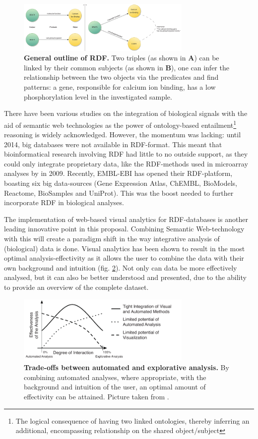 \documentclass[twoside,fontsize=12pt]{article}
\begin{document}
\begin{figure}[H]
    \centering
    \includegraphics[width=0.75\textwidth]{rdf.pdf}
    \caption{\textbf{General outline of RDF.} Two triples (as shown in \textbf{A}) can be linked by their common subjects (as shown in \textbf{B}), one can infer the relationship between the two objects via the predicates and find patterns: a gene, responsible for calcium ion binding, has a low phosphorylation level in the investigated sample.}
    \label{fig:rdf}
\end{figure}
\noindent
There have been various studies on the integration of biological signals with the aid of semantic web technologies as the power of ontology-based entailment\footnote{The logical consequence of having two linked ontologies, thereby inferring an additional, encompassing relationship on the shared object/subject} reasoning is widely acknowledged\cite{Sahoo2008}. However, the momentum was lacking: until 2014, big databases were not available in RDF-format. This meant that bioinformatical research involving RDF had little to no outside support, as they could only integrate proprietary data, like the RDF-methods used in microarray analyses by \citet{Szpakowski2009} in 2009. Recently, EMBL-EBI has opened their RDF-platform, boasting six big data-sources (Gene Expression Atlas, ChEMBL, BioModels, Reactome, BioSamples and UniProt)\cite{Jupp2014}. This was the boost needed to further incorporate RDF in biological analyses.


The implementation of web-based visual analytics for RDF-databases is another leading innovative point in this proposal. Combining Semantic Web-technology with this will create a paradigm shift in the way integrative analysis of (biological) data is done. Visual analytics has been shown to result in the most optimal analysis-effectivity as it allows the user to combine the data with their own background and intuition (fig. \ref{fig:ae}). Not only can data be more effectively analysed, but it can also be better understood and presented, due to the ability to provide an overview of the complete dataset\cite{Thomas2005, Keim}. 
\begin{figure}[h!]
    \centering
    \includegraphics[width=0.75\textwidth]{autoVSexplo.pdf}
    \caption{\textbf{Trade-offs between automated and explorative analysis.} By combining automated analyses, where appropriate, with the background and intuition of the user, an optimal amount of effectivity can be attained. Picture taken from \citet{Keim}.}
    \label{fig:ae}
\end{figure}
\end{document}
